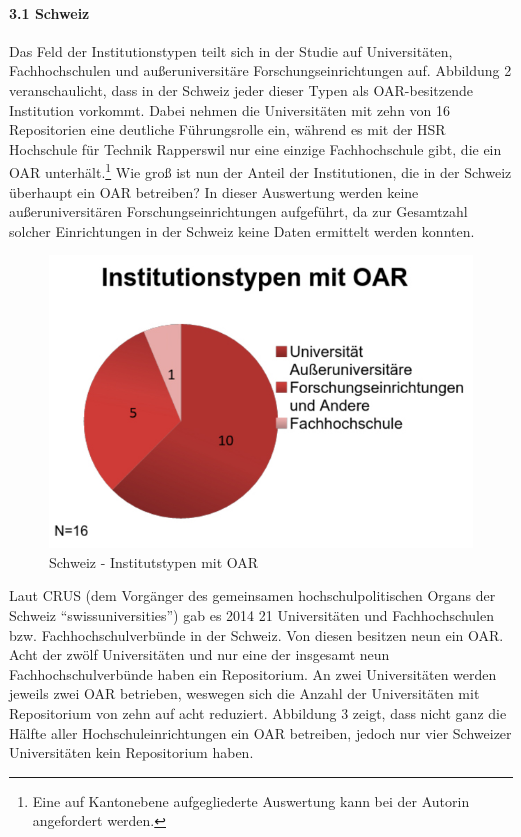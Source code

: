 \documentclass[a4paper,
fontsize=11pt,
oneside,
numbers=noperiodatend,
parskip=half-,
bibliography=totoc,
final
]{scrartcl}
\begin{document}
\paragraph{3.1 Schweiz}\label{schweiz-1}

Das Feld der Institutionstypen teilt sich in der Studie auf
Universitäten, Fachhochschulen und außeruniversitäre
Forschungseinrichtungen auf. Abbildung 2 veranschaulicht, dass in der
Schweiz jeder dieser Typen als OAR-besitzende Institution vorkommt.
Dabei nehmen die Universitäten mit zehn von 16 Repositorien eine
deutliche Führungsrolle ein, während es mit der HSR Hochschule für
Technik Rapperswil nur eine einzige Fachhochschule gibt, die ein OAR
unterhält.\footnote{Eine auf Kantonebene aufgegliederte Auswertung kann
  bei der Autorin angefordert werden.} Wie groß ist nun der Anteil der
Institutionen, die in der Schweiz überhaupt ein OAR betreiben? In dieser
Auswertung werden keine außeruniversitären Forschungseinrichtungen
aufgeführt, da zur Gesamtzahl solcher Einrichtungen in der Schweiz keine
Daten ermittelt werden konnten.

\begin{figure}[htbp]
\centering
\includegraphics{img/abb2_institutionentypen_oar.jpg}
\caption{Schweiz - Institutstypen mit OAR}
\end{figure}

Laut CRUS (dem Vorgänger des gemeinsamen hochschulpolitischen Organs der
Schweiz \enquote{swissuniversities}) gab es 2014 21 Universitäten und
Fachhochschulen bzw. Fachhochschulverbünde in der Schweiz. Von diesen
besitzen neun ein OAR. Acht der zwölf Universitäten und nur eine der
insgesamt neun Fachhochschulverbünde haben ein Repositorium. An zwei
Universitäten werden jeweils zwei OAR betrieben, weswegen sich die
Anzahl der Universitäten mit Repositorium von zehn auf acht reduziert.
Abbildung 3 zeigt, dass nicht ganz die Hälfte aller
Hochschuleinrichtungen ein OAR betreiben, jedoch nur vier Schweizer
Universitäten kein Repositorium haben.
\end{document}
